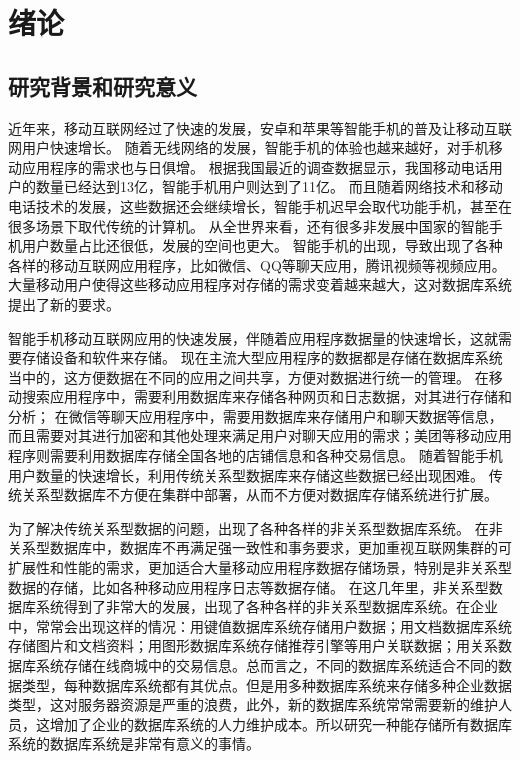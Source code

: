 
\chapter{绪论}
\section{研究背景和研究意义}
近年来，移动互联网经过了快速的发展，安卓和苹果等智能手机的普及让移动互联网用户快速增长。
随着无线网络的发展，智能手机的体验也越来越好，对手机移动应用程序的需求也与日俱增。
根据我国最近的调查数据显示，我国移动电话用户的数量已经达到13亿，智能手机用户则达到了11亿。
而且随着网络技术和移动电话技术的发展，这些数据还会继续增长，智能手机迟早会取代功能手机，甚至在很多场景下取代传统的计算机。
从全世界来看，还有很多非发展中国家的智能手机用户数量占比还很低，发展的空间也更大。
智能手机的出现，导致出现了各种各样的移动互联网应用程序，比如微信、QQ等聊天应用，腾讯视频等视频应用。
大量移动用户使得这些移动应用程序对存储的需求变着越来越大，这对数据库系统提出了新的要求。

智能手机移动互联网应用的快速发展，伴随着应用程序数据量的快速增长，这就需要存储设备和软件来存储。
现在主流大型应用程序的数据都是存储在数据库系统当中的，这方便数据在不同的应用之间共享，方便对数据进行统一的管理。
在移动搜索应用程序中，需要利用数据库来存储各种网页和日志数据，对其进行存储和分析；
在微信等聊天应用程序中，需要用数据库来存储用户和聊天数据等信息，而且需要对其进行加密和其他处理来满足用户对聊天应用的需求；美团等移动应用程序则需要利用数据库存储全国各地的店铺信息和各种交易信息。
随着智能手机用户数量的快速增长，利用传统关系型数据库来存储这些数据已经出现困难。
传统关系型数据库不方便在集群中部署，从而不方便对数据库存储系统进行扩展。

为了解决传统关系型数据的问题，出现了各种各样的非关系型数据库系统。
在非关系型数据库中，数据库不再满足强一致性和事务要求，更加重视互联网集群的可扩展性和性能的需求，更加适合大量移动应用程序数据存储场景，特别是非关系型数据的存储，比如各种移动应用程序日志等数据存储。
在这几年里，非关系型数据库系统得到了非常大的发展，出现了各种各样的非关系型数据库系统。在企业中，常常会出现这样的情况：用键值数据库系统存储用户数据；用文档数据库系统存储图片和文档资料；用图形数据库系统存储推荐引擎等用户关联数据；用关系数据库系统存储在线商城中的交易信息。总而言之，不同的数据库系统适合不同的数据类型，每种数据库系统都有其优点。但是用多种数据库系统来存储多种企业数据类型，这对服务器资源是严重的浪费，此外，新的数据库系统常常需要新的维护人员，这增加了企业的数据库系统的人力维护成本。所以研究一种能存储所有数据库系统的数据库系统是非常有意义的事情。


